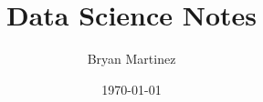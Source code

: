 \theoremstyle{definition}
\newtheorem{definition}{Definition}[section]
\newtheorem{example}[definition]{Example}

\theoremstyle{plain}
\newtheorem{theorem}[definition]{Theorem}
\newtheorem{proposition}[definition]{Proposition}
\newtheorem{lemma}[definition]{Lemma}
\newtheorem{corollary}[definition]{Corollary}

\theoremstyle{remark}
\newtheorem*{remark}{Remark}
\newtheorem*{note}{Note}

\renewcommand{\vec}[1]{\bm{#1}}                %
\newcommand{\mat}[1]{\bm{#1}}                  %

\newcommand{\E}{\mathbb{E}}                    %
\newcommand{\Prob}{\mathbb{P}}                 %
\newcommand{\Var}{\mathrm{Var}}
\newcommand{\Cov}{\mathrm{Cov}}
\newcommand{\Corr}{\mathrm{Corr}}

\newcommand{\R}{\mathbb{R}}
\newcommand{\N}{\mathbb{N}}
\newcommand{\Z}{\mathbb{Z}}

\newcommand{\indep}{\perp\!\!\!\perp}          %
\newcommand{\given}{\,|\,}                     %

\DeclareMathOperator*{\argmin}{arg\,min}
\DeclareMathOperator*{\argmax}{arg\,max}
\DeclareMathOperator{\sign}{sign}
\DeclareMathOperator{\softmax}{softmax}

\title{Data Science Notes}
\author{Bryan Martinez}
\date{\today}
